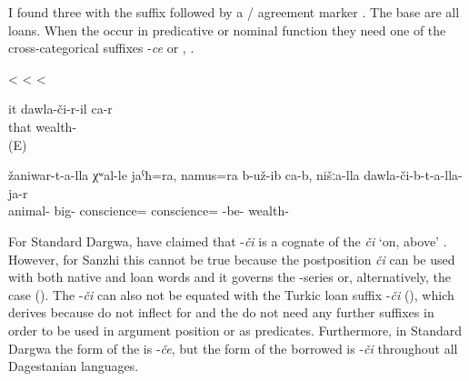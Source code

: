 I found three  with the suffix  followed by a / agreement marker . The base  are all loans. When the  occur in predicative or nominal function they need one of the cross-categorical suffixes -\textit{ce} or  , .

\begin{exe}
	\ex	\label{ex:adjectivesWithCHIB_1}
	\begin{xlist}
		\TabPositions{10em,12em}
		\ex	{}  		\tab	<	\tab	{} 
		\ex	{}   \tab	<	\tab	{} 
		\ex	{}   \tab	<	\tab	{} 
	\end{xlist}

	\ex	\label{ex:She is rich}
	\gll	it dawla-či-r-il ca-r \\
		that	wealth-	 \\
	\glt	{} (E)
	
	\ex	\label{The animals had apparently more consciences thatn our rich (people).}
	\gll žaniwar-t-a-lla				χʷal-le		jaˁħ=ra,	namus=ra		b-už-ib ca-b,	nišːa-lla		dawla-či-b-t-a-lla-ja-r \\
	animal-	big-	conscience=		conscience=	-be-				wealth- \\
	\glt	{}
	
\end{exe}

For Standard Dargwa, \citealp[212]{AbdullaevEtAl2014} have claimed that -\textit{či} is a cognate of the  \textit{či} `on, above' . However, for Sanzhi this cannot be true because the postposition \textit{či} can be used with both native and loan words and it governs the -series or, alternatively, the  case (). The  -\textit{či} can also not be equated with the Turkic loan suffix -\textit{či} (), which derives   because  do not inflect for  and the   do not need any further suffixes in order to be used in argument position or as predicates. Furthermore, in Standard Dargwa the form of the  is -\textit{če}, but the form of the borrowed  is -\textit{či} throughout all Dagestanian languages.


